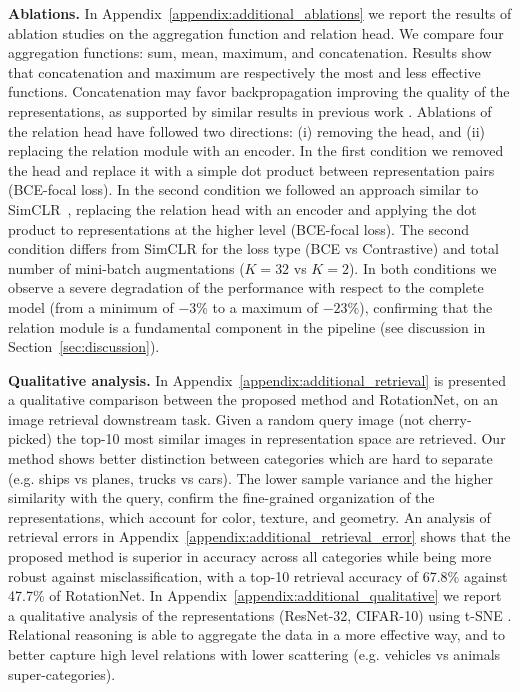 \documentclass{article}
\begin{document}
\textbf{Ablations.} In Appendix~\ref{appendix:additional_ablations} we report the results of ablation studies on the aggregation function and relation head. We compare four aggregation functions: sum, mean, maximum, and concatenation. Results show that concatenation and maximum are respectively the most and less effective functions. Concatenation may favor backpropagation improving the quality of the representations, as supported by similar results in previous work \citep{sung2018learning}. Ablations of the relation head have followed two directions: (i) removing the head, and (ii) replacing the relation module with an encoder. In the first condition we removed the head and replace it with a simple dot product between representation pairs (BCE-focal loss). In the second condition we followed an approach similar to SimCLR~\citep{chen2020simple}, replacing the relation head with an encoder and applying the dot product to representations at the higher level (BCE-focal loss). The second condition differs from SimCLR for the loss type (BCE vs Contrastive) and total number of mini-batch augmentations ($K=32$ vs $K=2$). In both conditions we observe a severe degradation of the performance with respect to the complete model (from a minimum of $-3\%$ to a maximum of $-23\%$), confirming that the relation module is a fundamental component in the pipeline (see discussion in Section~\ref{sec:discussion}).

\textbf{Qualitative analysis.} In Appendix~\ref{appendix:additional_retrieval} is presented a qualitative comparison between the proposed method and RotationNet, on an image retrieval downstream task. Given a random query image (not cherry-picked) the top-10 most similar images in representation space are retrieved. Our method shows better distinction between categories which are hard to separate (e.g. ships vs planes, trucks vs cars). The lower sample variance and the higher similarity with the query, confirm the fine-grained organization of the representations, which account for color, texture, and geometry. An analysis of retrieval errors in Appendix~\ref{appendix:additional_retrieval_error} shows that the proposed method is superior in accuracy across all categories while being more robust against misclassification, with a top-10 retrieval accuracy of 67.8\% against 47.7\% of RotationNet. In Appendix~\ref{appendix:additional_qualitative} we report a qualitative analysis of the representations (ResNet-32, CIFAR-10) using t-SNE \citep{maaten2008visualizing}. Relational reasoning is able to aggregate the data in a more effective way, and to better capture high level relations with lower scattering (e.g. vehicles vs animals super-categories).
\end{document}
